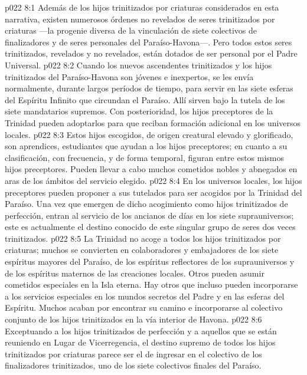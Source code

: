 \vs p022 8:1 Además de los hijos trinitizados por criaturas considerados en esta narrativa, existen numerosos órdenes no revelados de seres trinitizados por criaturas ---la progenie diversa de la vinculación de siete colectivos de finalizadores y de seres personales del Paraíso\hyp{}Havona---. Pero todos estos seres trinitizados, revelados y no revelados, están dotados de ser personal por el Padre Universal.
\vs p022 8:2 \pc Cuando los nuevos ascendentes trinitizados y los hijos trinitizados del Paraíso\hyp{}Havona son jóvenes e inexpertos, se les envía normalmente, durante largos períodos de tiempo, para servir en las siete esferas del Espíritu Infinito que circundan el Paraíso. Allí sirven bajo la tutela de los siete mandatarios supremos. Con posterioridad, los hijos preceptores de la Trinidad pueden adoptarlos para que reciban formación adicional en los universos locales.
\vs p022 8:3 Estos hijos escogidos, de origen creatural elevado y glorificado, son aprendices, estudiantes que ayudan a los hijos preceptores; en cuanto a su clasificación, con frecuencia, y de forma temporal, figuran entre estos mismos hijos preceptores. Pueden llevar a cabo muchos cometidos nobles y abnegados en aras de los ámbitos del servicio elegido.
\vs p022 8:4 En los universos locales, los hijos preceptores pueden proponer a sus tutelados para ser acogidos por la Trinidad del Paraíso. Una vez que emergen de dicho acogimiento como hijos trinitizados de perfección, entran al servicio de los ancianos de días en los siete suprauniversos; este es actualmente el destino conocido de este singular grupo de seres dos veces trinitizados.
\vs p022 8:5 La Trinidad no acoge a todos los hijos trinitizados por criaturas; muchos se convierten en colaboradores y embajadores de los siete espíritus mayores del Paraíso, de los espíritus reflectores de los suprauniversos y de los espíritus maternos de las creaciones locales. Otros pueden asumir cometidos especiales en la Isla eterna. Hay otros que incluso pueden incorporarse a los servicios especiales en los mundos secretos del Padre y en las esferas del Espíritu. Muchos acaban por encontrar su camino e incorporarse al colectivo conjunto de los hijos trinitizados en la vía interior de Havona.
\vs p022 8:6 Exceptuando a los hijos trinitizados de perfección y a aquellos que se están reuniendo en Lugar de Vicerregencia, el destino supremo de todos los hijos trinitizados por criaturas parece ser el de ingresar en el colectivo de los finalizadores trinitizados, uno de los siete colectivos finales del Paraíso.
